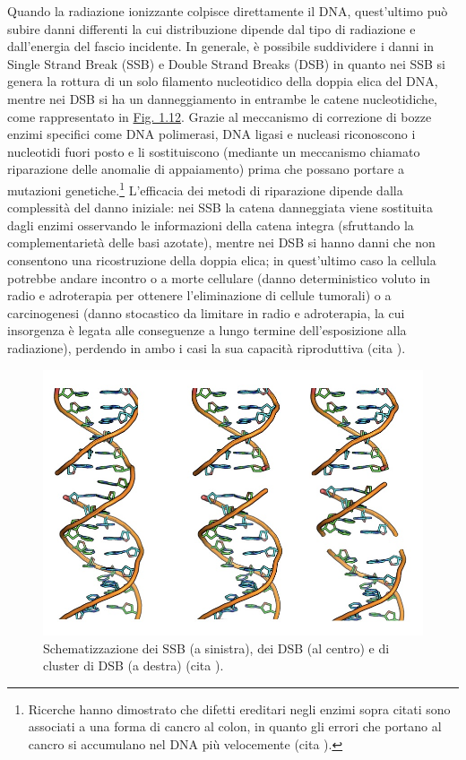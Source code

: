 \documentclass[12pt,a4paper,twoside]{report}
\begin{document}
	Quando la radiazione ionizzante colpisce direttamente il DNA, quest'ultimo può subire danni differenti la cui distribuzione dipende dal tipo di radiazione e dall'energia del fascio incidente. In generale, è possibile suddividere i danni in Single Strand Break (SSB) e Double Strand Breaks (DSB) in quanto nei SSB si genera la rottura di un solo filamento nucleotidico della doppia elica del DNA, mentre nei DSB si ha un danneggiamento in entrambe le catene nucleotidiche, come rappresentato in \hyperref[fig:danni_dna]{Fig. 1.12}. Grazie al meccanismo di correzione di bozze enzimi specifici come DNA polimerasi, DNA ligasi e nucleasi riconoscono i nucleotidi fuori posto e li sostituiscono (mediante un meccanismo chiamato riparazione delle anomalie di appaiamento) prima che possano portare a mutazioni genetiche.\footnote{Ricerche hanno dimostrato che difetti ereditari negli enzimi sopra citati sono associati a una forma di cancro al colon, in quanto gli errori che portano al cancro si accumulano nel DNA più velocemente (cita
	).} L'efficacia dei metodi di riparazione dipende dalla complessità del danno iniziale: nei SSB la catena danneggiata viene sostituita dagli enzimi osservando le informazioni della catena integra (sfruttando la complementarietà delle basi azotate), mentre nei DSB si hanno danni che non consentono una ricostruzione della doppia elica; in quest'ultimo caso la cellula potrebbe andare incontro o a morte cellulare (danno deterministico voluto in radio e adroterapia per ottenere l'eliminazione di cellule tumorali) o a carcinogenesi (danno stocastico da limitare in radio e adroterapia, la cui insorgenza è legata alle conseguenze a lungo termine dell'esposizione alla radiazione), perdendo in ambo i casi la sua capacità riproduttiva (cita
	).
	
	\begin{figure}[H]
		\centering
		\includegraphics[width=0.9\linewidth]{images/danni_dna.jpg}
		\caption{Schematizzazione dei SSB (a sinistra), dei DSB (al centro) e di cluster di DSB (a destra) (cita
			).}
		\label{fig:danni_dna}
	\end{figure}
	
\end{document}
